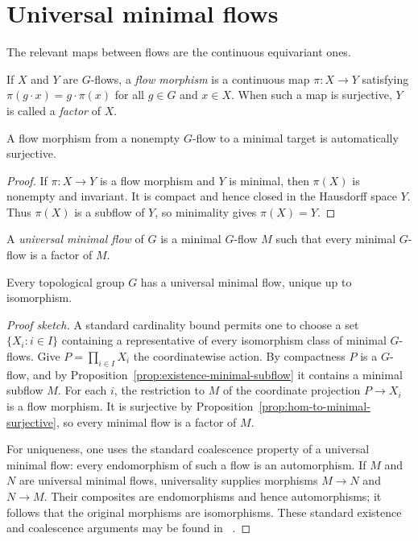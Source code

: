 \section{Universal minimal flows}

The relevant maps between flows are the continuous equivariant ones.

\begin{definition}
    If \(X\) and \(Y\) are \(G\)-flows, a \emph{flow morphism} is a continuous
    map \(\pi\colon X\to Y\) satisfying
    \(\pi(g\cdot x)=g\cdot\pi(x)\) for all \(g\in G\) and \(x\in X\).
    When such a map is surjective, \(Y\) is called a \emph{factor} of \(X\).
\end{definition}

\begin{proposition}
    \label{prop:hom-to-minimal-surjective}
    A flow morphism from a nonempty \(G\)-flow to a minimal target is
    automatically surjective.
\end{proposition}

\begin{proof}
    If \(\pi\colon X\to Y\) is a flow morphism and \(Y\) is minimal, then
    \(\pi(X)\) is nonempty and invariant.  It is compact and hence closed in
    the Hausdorff space \(Y\).  Thus \(\pi(X)\) is a subflow of \(Y\), so
    minimality gives \(\pi(X)=Y\).
\end{proof}

\begin{definition}
    A \emph{universal minimal flow} of \(G\) is a minimal \(G\)-flow \(M\)
    such that every minimal \(G\)-flow is a factor of \(M\).
\end{definition}

\begin{theorem}
    \label{thm:universal-minimal-flow}
    Every topological group \(G\) has a universal minimal flow, unique up to
    isomorphism.
\end{theorem}

\begin{proof}[Proof sketch]
    A standard cardinality bound permits one to choose a set
    \(\{X_i:i\in I\}\) containing a representative of every isomorphism class
    of minimal \(G\)-flows.  Give \(P=\prod_{i\in I}X_i\) the coordinatewise
    action.  By compactness \(P\) is a \(G\)-flow, and by
    Proposition~\ref{prop:existence-minimal-subflow} it contains a minimal
    subflow \(M\).  For each \(i\), the restriction to \(M\) of the coordinate
    projection \(P\to X_i\) is a flow morphism.  It is surjective by
    Proposition~\ref{prop:hom-to-minimal-surjective}, so every minimal flow is
    a factor of \(M\).

    For uniqueness, one uses the standard coalescence property of a universal
    minimal flow: every endomorphism of such a flow is an automorphism.  If
    \(M\) and \(N\) are universal minimal flows, universality supplies morphisms
    \(M\to N\) and \(N\to M\).  Their composites are endomorphisms and hence
    automorphisms; it follows that the original morphisms are isomorphisms.
    These standard existence and coalescence arguments may be found in
   ~\cite{A,dV}.
\end{proof}

